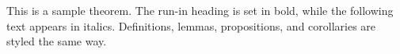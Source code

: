 \begin{theorem}
This is a sample theorem. The run-in heading is set in bold, while
the following text appears in italics. Definitions, lemmas,
propositions, and corollaries are styled the same way.
\end{theorem}
